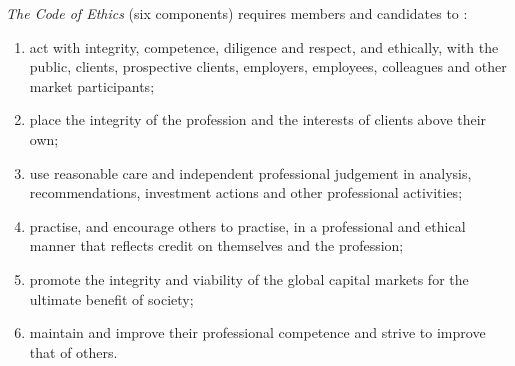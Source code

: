 \begin{qfdefinition}\label{def:code-of-ethics-standards}
 \emph{The Code of Ethics} (six components) requires members and candidates to \citep[p.~xviii]{standards-practice-handbook-2024}:
\begin{enumerate}
\item act with integrity, competence, diligence and respect, and ethically, with the public, clients, prospective clients, employers, employees, colleagues and other market participants;
\item place the integrity of the profession and the interests of clients above their own;
\item use reasonable care and independent professional judgement in analysis, recommendations, investment actions and other professional activities;
\item practise, and encourage others to practise, in a professional and ethical manner that reflects credit on themselves and the profession;
\item promote the integrity and viability of the global capital markets for the ultimate benefit of society;
\item maintain and improve their professional competence and strive to improve that of others.
\end{enumerate}


\end{qfdefinition}

